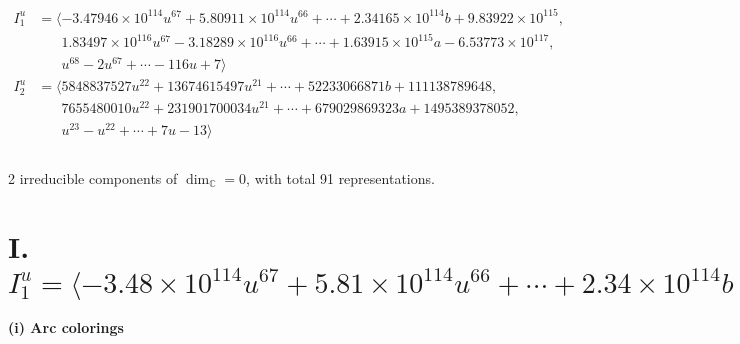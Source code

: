 \documentclass[1p]{elsarticle_modified}
\theoremstyle{definition}
\begin{document}
\begin{align*}
I^u_{1}&=\langle 
-3.47946\times10^{114} u^{67}+5.80911\times10^{114} u^{66}+\cdots+2.34165\times10^{114} b+9.83922\times10^{115},\\
\phantom{I^u_{1}}&\phantom{= \langle  }1.83497\times10^{116} u^{67}-3.18289\times10^{116} u^{66}+\cdots+1.63915\times10^{115} a-6.53773\times10^{117},\\
\phantom{I^u_{1}}&\phantom{= \langle  }u^{68}-2 u^{67}+\cdots-116 u+7\rangle \\
I^u_{2}&=\langle 
5848837527 u^{22}+13674615497 u^{21}+\cdots+52233066871 b+111138789648,\\
\phantom{I^u_{2}}&\phantom{= \langle  }7655480010 u^{22}+231901700034 u^{21}+\cdots+679029869323 a+1495389378052,\\
\phantom{I^u_{2}}&\phantom{= \langle  }u^{23}- u^{22}+\cdots+7 u-13\rangle \\
\\
\end{align*}
\raggedright * 2 irreducible components of $\dim_{\mathbb{C}}=0$, with total 91 representations.\\
\newpage
\renewcommand{\arraystretch}{1}
\centering \section*{I. $I^u_{1}= \langle -3.48\times10^{114} u^{67}+5.81\times10^{114} u^{66}+\cdots+2.34\times10^{114} b+9.84\times10^{115},\;1.83\times10^{116} u^{67}-3.18\times10^{116} u^{66}+\cdots+1.64\times10^{115} a-6.54\times10^{117},\;u^{68}-2 u^{67}+\cdots-116 u+7 \rangle$}
\flushleft \textbf{(i) Arc colorings}\\
\end{document}
